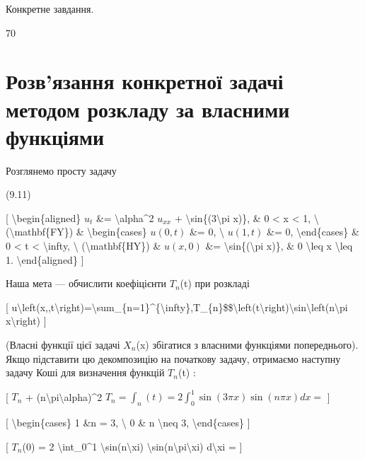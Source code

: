 \documentclass[
]{article}
\begin{document}
{{Конкретне завдання.

70

\section{Розв'язання конкретної задачі методом розкладу за власними
функціями}\label{ux440ux43eux437ux432ux44fux437ux430ux43dux43dux44f-ux43aux43eux43dux43aux440ux435ux442ux43dux43eux457-ux437ux430ux434ux430ux447ux456-ux43cux435ux442ux43eux434ux43eux43c-ux440ux43eux437ux43aux43bux430ux434ux443-ux437ux430-ux432ux43bux430ux441ux43dux438ux43cux438-ux444ux443ux43dux43aux446ux456ux44fux43cux438}

Розглянемо просту задачу

(9.11)

{[} \textbackslash begin\{aligned\} \(u_t\) \&=
\textbackslash alpha\^{}2 \(u_{xx}\) +
\textbackslash sin\{(3\textbackslash pi x)\}, \& 0 \textless{} x
\textless{} 1, \textbackslash{} (\textbackslash mathbf\{FY\}) \&
\textbackslash begin\{cases\} \(u(0, t)\) \&= 0, \textbackslash{}
\(u(1, t)\) \&= 0, \textbackslash end\{cases\} \& 0 \textless{} t
\textless{} \textbackslash infty, \textbackslash{}
(\textbackslash mathbf\{HY\}) \& \(u(x, 0)\) \&=
\textbackslash sin\{(\textbackslash pi x)\}, \& 0 \textbackslash leq x
\textbackslash leq 1. \textbackslash end\{aligned\} {]}

Наша мета --- обчислити коефіцієнти \(T_n\)(t) при розкладі

{[}
u\textbackslash left(x,,t\textbackslash right)=\textbackslash sum\_\{n=1\}\^{}\{\textbackslash infty\},T\_\{n\}\$\$\textbackslash left(t\textbackslash right)\textbackslash sin\textbackslash left(n\textbackslash pi
x\textbackslash right) {]}

(Власні функції цієї задачі \(X_n\)(x) збігатися з власними функціями
попереднього). Якщо підставити цю декомпозицію на початкову задачу,
отримаємо наступну задачу Коші для визначення функцій \(T_n\)(t) :

{[} \(T_n\) + (n\textbackslash pi\textbackslash alpha)\^{}2
\(T_n = \int_n (t) = 2 \int_0^1 \sin(3\pi x) \sin(n\pi x) dx =\) {]}

{[} \textbackslash begin\{cases\} 1 \&n = 3, \textbackslash{} 0 \& n
\textbackslash neq 3, \textbackslash end\{cases\} {]}

{[} \(T_n\)(0) = 2 \textbackslash int\_0\^{}1
\textbackslash sin(n\textbackslash xi)
\textbackslash sin(n\textbackslash pi\textbackslash xi)
d\textbackslash xi = {]}

}}
\end{document}

